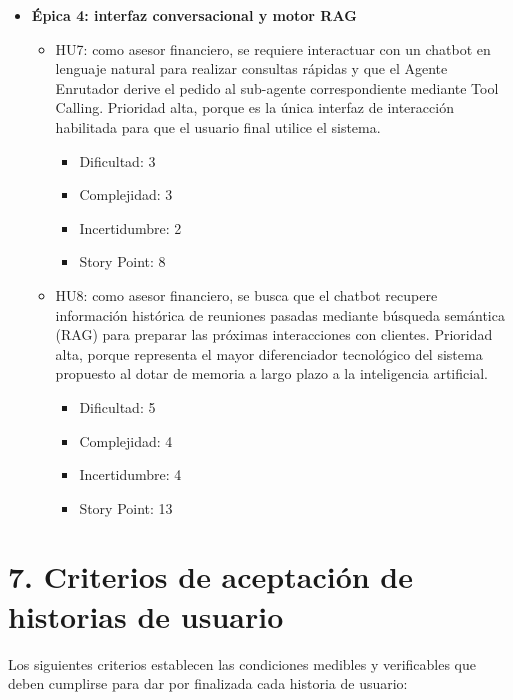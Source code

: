 \documentclass[
11pt, %
]{charter}
\begin{document}
\begin{itemize}
  \item \textbf{\'{E}pica 4: interfaz conversacional y motor RAG}
    \begin{itemize}
      \item HU7: como asesor financiero, se requiere interactuar con un chatbot en lenguaje natural para realizar consultas rápidas y que el Agente Enrutador derive el pedido al sub-agente correspondiente mediante Tool Calling. Prioridad alta, porque es la única interfaz de interacción habilitada para que el usuario final utilice el sistema. 
        \begin{itemize}
            \item Dificultad: 3
            \item Complejidad: 3
            \item Incertidumbre: 2
            \item Story Point: 8
        \end{itemize}
      \item HU8: como asesor financiero, se busca que el chatbot recupere información histórica de reuniones pasadas mediante búsqueda semántica (RAG) para preparar las próximas interacciones con clientes. Prioridad alta, porque representa el mayor diferenciador tecnológico del sistema propuesto al dotar de memoria a largo plazo a la inteligencia artificial.
        \begin{itemize}
            \item Dificultad: 5
            \item Complejidad: 4
            \item Incertidumbre: 4
            \item Story Point: 13
        \end{itemize}
    \end{itemize}
\end{itemize}

\section{7. Criterios de aceptación de historias de usuario}
\label{sec:criteriosAceptacion}

Los siguientes criterios establecen las condiciones medibles y verificables que deben cumplirse para dar por finalizada cada historia de usuario:
\end{document}
